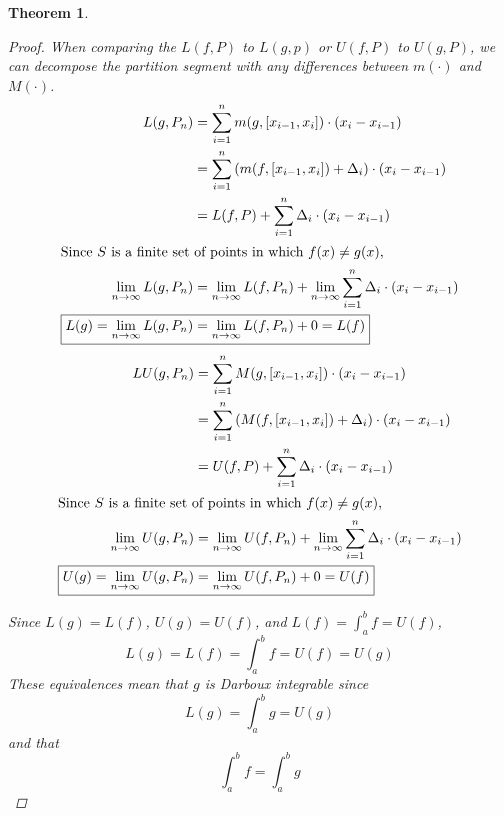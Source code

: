 \documentclass[]{article}
\newtheorem{theorem}{Theorem}
\begin{document}
\begin{theorem}
\begin{proof}
        When comparing the $L(f,P)$ to $L(g,p)$ or $U(f,P)$ to $U(g,P)$,
        we can decompose the partition segment with any differences between $m(\cdot)$ and $M(\cdot)$.
        \begin{align*}
            L(g,P_n) &= \sum_{i=1}^{n} m(g, [x_{i-1},x_{i}]) \cdot (x_{i} - x_{i-1})\\
                &= \sum_{i=1}^{n} \qty(m(f, [x_{i-1},x_{i}]) + \Delta_{i}) \cdot (x_{i} - x_{i-1})\\
                &= L(f,P) + \sum_{i=1}^{n} \Delta_{i} \cdot (x_{i} - x_{i-1})\\
        \intertext{Since $S$ is a finite set of points in which $f(x) \neq g(x)$,}
            \lim_{n\to\infty} L(g,P_n) &= \lim_{n\to\infty} L(f,P_n) + \lim_{n\to\infty} \sum_{i=1}^{n} \Delta_{i} \cdot (x_{i} - x_{i-1})\\
            \Aboxed{L(g) = \lim_{n\to\infty} L(g,P_n) &= \lim_{n\to\infty} L(f,P_n) + 0 = L(f)}
        \end{align*}
        \begin{align*}
            LU(g,P_n) &= \sum_{i=1}^{n} M(g, [x_{i-1},x_{i}]) \cdot (x_{i} - x_{i-1})\\
                &= \sum_{i=1}^{n} \qty(M(f, [x_{i-1},x_{i}]) + \Delta_{i}) \cdot (x_{i} - x_{i-1})\\
                &= U(f,P) + \sum_{i=1}^{n} \Delta_{i} \cdot (x_{i} - x_{i-1})\\
        \intertext{Since $S$ is a finite set of points in which $f(x) \neq g(x)$,}
            \lim_{n\to\infty} U(g,P_n) &= \lim_{n\to\infty} U(f,P_n) + \lim_{n\to\infty} \sum_{i=1}^{n} \Delta_{i} \cdot (x_{i} - x_{i-1})\\
            \Aboxed{U(g) = \lim_{n\to\infty} U(g,P_n) &= \lim_{n\to\infty} U(f,P_n) + 0 = U(f)}
        \end{align*}

        Since $L(g) = L(f)$, $U(g) = U(f)$, and $L(f) = \int_{a}^{b} f = U(f)$,\[
            L(g) = L(f) = \int_{a}^{b} f = U(f) = U(g)
        \]
        These equivalences mean that $g$ is Darboux integrable since \[
            \boxed{L(g) = \int_{a}^{b} g = U(g)}
        \] and that \[
            \boxed{\int_{a}^{b} f = \int_{a}^{b} g}
        \]
    \end{proof}
\end{theorem}
\end{document}
